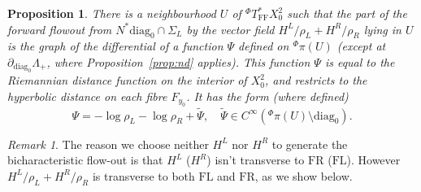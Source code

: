 \documentclass[10pt, a4paper, twoside]{amsart}
\numberwithin{equation}{section}
\newtheorem{proposition}[theorem]{Proposition}
\theoremstyle{remark}
\newtheorem{remark}[theorem]{Remark}
\begin{document}
\begin{proposition}\label{prop:near-ff}
There is a neighbourhood $U$ of ${}^\Phi T^*_{\mathrm{FF}} X^2_0$
such that the part of the forward flowout from $N^* {\mathrm{diag}_0} \cap \Sigma_L$ by the vector field $H^{L}/\rho_L + H^R/\rho_R$ lying in $U$ is the graph of the differential of a function $\Psi$ defined on ${}^\Phi \pi(U)$ (except at $\partial_{\mathrm{diag}_0} \Lambda_+$, where Proposition~\ref{prop:nd} applies). This function $\Psi$ is equal to the Riemannian distance function on the interior of $X^2_0$, and restricts to the hyperbolic distance on each fibre $F_{y_0}$. It has the form (where defined) 
\begin{equation}
\Psi = -\log \rho_L - \log \rho_R + \tilde \Psi, \quad \tilde \Psi \in C^\infty({}^\Phi \pi(U) \setminus {\mathrm{diag}_0}). 
\end{equation}
\end{proposition}

\begin{remark}The reason we choose neither $H^L$ nor $H^R$ to generate the bicharacteristic flow-out is that $H^L$ ($H^R$) isn't transverse to ${\mathrm{FR}}$ (${\mathrm{FL}}$). However $H^{L}/\rho_L + H^R/\rho_R$ is transverse to both ${\mathrm{FL}}$ and ${\mathrm{FR}}$, as we show below.
\end{remark}
\end{document}
